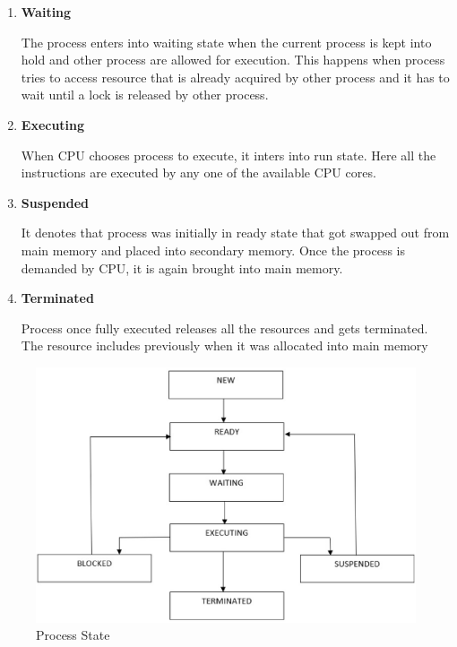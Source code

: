 \begin{onehalfspacing}
\begin{enumerate}
    \item  \textbf{Waiting}
    \par The process enters into waiting state when the current process is kept into hold and other process are allowed for execution. This happens when process tries to access resource that is already acquired by other process and it has to wait until a lock is released by other process.
    
    \item  \textbf{Executing}
    \par When CPU chooses process to execute, it inters into run state. Here all the instructions are executed by any one of the available CPU cores.
    
    \item  \textbf{Suspended}
    \par It denotes that process was initially in ready state that got swapped out from main memory and placed into secondary memory. Once the process is demanded by CPU, it is again brought into main memory.
    
    \item  \textbf{Terminated}
    \par Process once fully executed releases all the resources and gets terminated. The resource includes previously when it was allocated into main memory

\end{enumerate}

\newpage
\begin{figure}[h]
    \centering
    \includegraphics[width=15cm]{./process_state.eps}
    \caption{Process State}
    \label{fig:my_label}
\end{figure}


\end{onehalfspacing}

